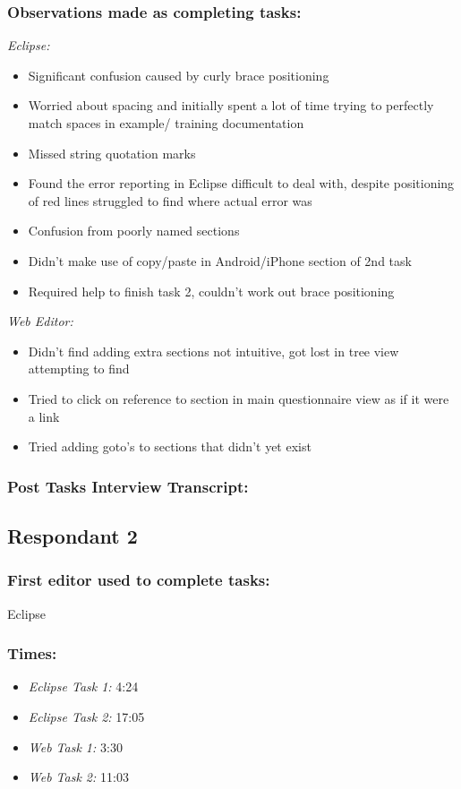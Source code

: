 \documentclass{report}
\begin{document}
\subsubsection*{Observations made as completing tasks:}

\emph{Eclipse:}
\begin{itemize}
\item Significant confusion caused by curly brace positioning
\item Worried about spacing and initially spent a lot of time trying to perfectly match spaces in example/ training documentation
\item Missed string quotation marks
\item Found the error reporting in Eclipse difficult to deal with, despite positioning of red lines struggled to find where actual error was
\item Confusion from poorly named sections
\item Didn't make use of copy/paste in Android/iPhone section of 2nd task
\item Required help to finish task 2, couldn't work out brace positioning
\end{itemize}
\emph{Web Editor:}
\begin{itemize}
\item Didn't find adding extra sections not intuitive, got lost in tree view attempting to find
\item Tried to click on reference to section in main questionnaire view as if it were a link
\item Tried adding goto's to sections that didn't yet exist
\end{itemize}

\subsubsection*{Post Tasks Interview Transcript:}

\newpage
\subsection{Respondant 2}
\subsubsection*{First editor used to complete tasks:} Eclipse
\subsubsection*{Times:}
\begin{itemize}
\item \emph{Eclipse Task 1:} 4:24
\item \emph{Eclipse Task 2:} 17:05
\item \emph{Web Task 1:} 3:30
\item \emph{Web Task 2:} 11:03
\end{itemize}
\end{document}
